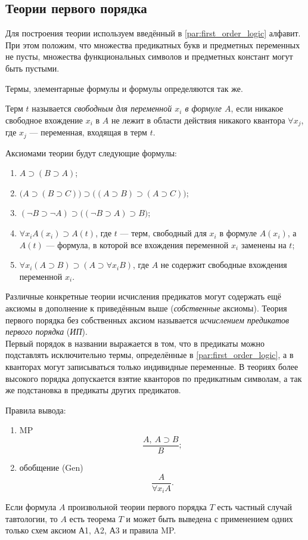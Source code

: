 \subsection{Теории первого порядка}
Для построения теории используем введённый в \ref{par:first_order_logic} алфавит. При этом положим, что множества предикатных букв и предметных переменных не пусты, множества функциональных символов и предметных констант могут быть пустыми.

Термы, элементарные формулы и формулы определяются так же.

\begin{definition*}
    Терм $t$ называется \textit{свободным для переменной $x_i$ в формуле $A$}, если никакое свободное вхождение $x_i$ в $A$ не лежит в области действия никакого квантора $\forall x_j$, где $x_j$ --- переменная, входящая в терм $t$.
\end{definition*}

Аксиомами теории будут следующие формулы:
\begin{enumerate}[label=(А\arabic*)]
    \item $A \supset (B \supset A)$;
    \item $\big(A \supset (B \supset C)\big) \supset \big((A \supset B) \supset (A \supset C)\big)$;
    \item $(\neg B \supset \neg A) \supset \big((\neg B \supset A) \supset B\big)$;
    \item $\forall x_iA(x_i) \supset A(t)$, где $t$ --- терм, свободный для $x_i$ в формуле $A(x_i)$, а $A(t)$ --- формула, в которой все вхождения переменной $x_i$ заменены на $t$;
    \item $\forall x_i(A \supset B) \supset (A \supset \forall x_iB)$, где $A$ не содержит свободные вхождения переменной $x_i$.
\end{enumerate}
Различные конкретные теории исчисления предикатов могут содержать ещё аксиомы в дополнение к приведённым выше (\textit{собственные} аксиомы). Теория первого порядка без собственных аксиом называется \textit{исчислением предикатов первого порядка} (\textit{ИП}). \\
Первый порядок в названии выражается в том, что в предикаты можно подставлять исключительно термы, определённые в \ref{par:first_order_logic}, а в кванторах могут записываться только индивидные переменные. В теориях более высокого порядка допускается взятие кванторов по предикатным символам, а так же подстановка в предикаты других предикатов.

Правила вывода:
\begin{enumerate}[label=\arabic*)]
    \item MP
    \[
        \frac{A,\ A \supset B}{B};
    \]
    \item обобщение (Gen)
    \[
        \frac{A}{\forall x_iA}.
    \]
\end{enumerate}

\begin{lemma}
    Если формула $A$ произвольной теории первого порядка $T$ есть частный случай тавтологии, то $A$ есть теорема $T$ и может быть выведена с применением одних только схем аксиом А1, A2, А3 и правила MP.
\end{lemma}